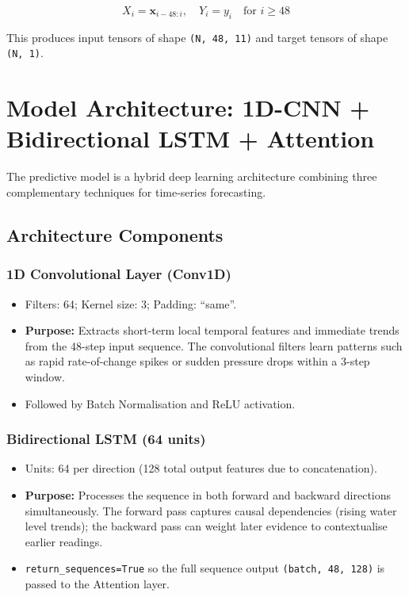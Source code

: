 \begin{equation}
  X_i = \mathbf{x}_{i-48:i}, \quad Y_i = y_i \quad \text{for } i \geq 48
\end{equation}

This produces input tensors of shape \texttt{(N,\allowbreak{} 48,\allowbreak{} 11)} and target tensors of shape \texttt{(N,\allowbreak{} 1)}.

\section{Model Architecture: 1D-CNN + Bidirectional LSTM + Attention}

The predictive model is a hybrid deep learning architecture combining three complementary techniques for time-series forecasting.

\subsection{Architecture Components}

\subsubsection{1D Convolutional Layer (Conv1D)}
\begin{itemize}[leftmargin=1.5em]
  \item Filters: 64; Kernel size: 3; Padding: ``same''.
  \item \textbf{Purpose:} Extracts short-term local temporal features and immediate trends from the 48-step input sequence. The convolutional filters learn patterns such as rapid rate-of-change spikes or sudden pressure drops within a 3-step window.
  \item Followed by Batch Normalisation and ReLU activation.
\end{itemize}

\subsubsection{Bidirectional LSTM (64 units)}
\begin{itemize}[leftmargin=1.5em]
  \item Units: 64 per direction (128 total output features due to concatenation).
  \item \textbf{Purpose:} Processes the sequence in both forward and backward directions simultaneously. The forward pass captures causal dependencies (rising water level trends); the backward pass can weight later evidence to contextualise earlier readings.
  \item \texttt{return\_\allowbreak{}sequences=True} so the full sequence output \texttt{(batch,\allowbreak{} 48,\allowbreak{} 128)} is passed to the Attention layer.
\end{itemize}

